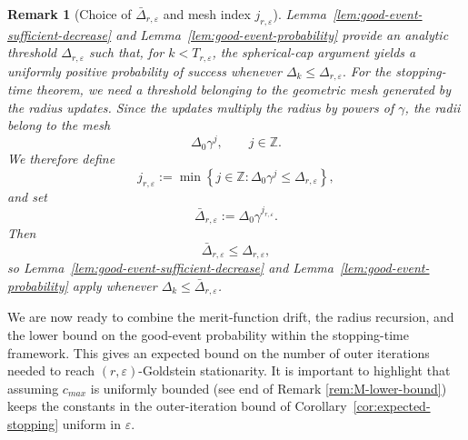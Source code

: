 \documentclass[11pt,a4paper]{article}
\newtheorem{remark}{Remark}[section]
\newcommand{\goldelta}{r}
\begin{document}
\begin{remark}[Choice of $\bar{\Delta}_{r,\varepsilon}$ and mesh index $j_{r,\varepsilon}$]\label{rem: choice of delta'}
Lemma~\ref{lem:good-event-sufficient-decrease} and Lemma~\ref{lem:good-event-probability} provide an analytic threshold
\(\Delta_{\goldelta,\varepsilon}\) such that, for
\(k<T_{\goldelta,\varepsilon}\), the spherical-cap argument yields a uniformly
positive probability of success whenever
\(
    \Delta_k\le\Delta_{\goldelta,\varepsilon}.
\)
For the stopping-time theorem, we need a threshold belonging to
the geometric mesh generated by the radius updates. Since the updates multiply
the radius by powers of \(\gamma\), the radii belong to the mesh
\[
    \Delta_0\gamma^j,
    \qquad j\in\mathbb Z.
\]
We therefore define
\[
    j_{\goldelta,\varepsilon}
    :=
    \min\left\{
        j\in\mathbb Z:
        \Delta_0\gamma^j\le\Delta_{\goldelta,\varepsilon}
    \right\},
\]
and set
\[
    \bar\Delta_{\goldelta,\varepsilon}
    :=
    \Delta_0\gamma^{j_{\goldelta,\varepsilon}}.
\]
Then
\[
    \bar\Delta_{\goldelta,\varepsilon}
    \le
    \Delta_{\goldelta,\varepsilon},
\]
so Lemma~\ref{lem:good-event-sufficient-decrease} and  Lemma~\ref{lem:good-event-probability} apply whenever
 \(\Delta_k\le\bar\Delta_{\goldelta,\varepsilon}\).
\end{remark}
We are now ready to combine the merit-function drift, the radius recursion, and
the lower bound on the good-event probability within the stopping-time framework.
This gives an expected bound on the number of outer iterations needed to reach
\((\goldelta,\varepsilon)\)-Goldstein stationarity. It is important to highlight that assuming $c_{max}$ is uniformly bounded (see end of Remark \ref{rem:M-lower-bound}) keeps the constants in the
outer-iteration bound of Corollary~\ref{cor:expected-stopping} uniform in \(\varepsilon\). 
\end{document}

